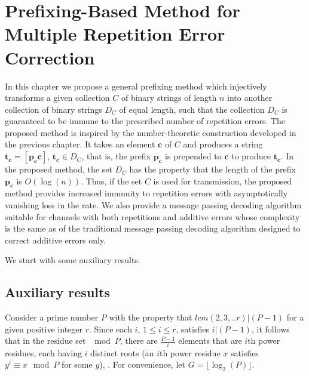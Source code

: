 \chapter[Prefixing-Based Method for Multiple Repetition Error Correction]{Prefixing-Based Method for  Multiple Repetition Error Correction}\label{prefixing}

 In this
chapter we propose a general prefixing method which injectively
transforms a given collection $C$ of binary strings of length $n$
into another collection of binary strings $D_C$ of equal length,
such that the collection $D_C$ is guaranteed to be immune to the
prescribed number of repetition errors. The proposed method is
inspired by the number-theoretic construction developed in the
previous chapter. It takes an element $\mathbf{c}$ of $C$ and
produces a string $\mathbf{t_c} =[\mathbf{p_c} \mathbf{c}]$,
$\mathbf{t_c} \in D_C$, that is, the prefix $\mathbf{p_c}$ is
prepended to $\mathbf{c}$ to produce $\mathbf{t_c}$. In the proposed
method, the set $D_C$ has the property that the length of the prefix
$\mathbf{p_c}$ is $O(\log(n))$. Thus, if the set $C$ is used for
transmission, the proposed method provides increased immunity to
repetition errors with asymptotically vanishing loss in the rate. We
also provide a message passing decoding algorithm suitable for
channels with both repetitions and additive errors whose complexity
is the same as of the traditional message passing decoding algorithm
designed to correct additive errors only.

 We start with some auxiliary
results. %

\section{Auxiliary results}\label{aux2} Consider a prime number $P$
with the property that $lcm(2,3,..r) | (P-1)$ for a given positive
integer $r$. Since each $i$, $1 \leq i \leq r$, satisfies $i|(P-1)$,
it follows that in the residue set $\mod P$, there are
$\frac{P-1}{i}$ elements that are $i$th power residues, each having
$i$ distinct roots (an $i$th power residue $x$ satisfies $y^i \equiv
x \mod P$ for some $y$), \cite{apostol}. For convenience, let $G =
\lfloor \log_2(P) \rfloor$.

